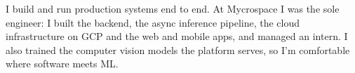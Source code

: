 
\begin{cvparagraph}
I build and run production systems end to end. At Mycrospace I was the sole engineer: I built the backend, the async inference pipeline, the cloud infrastructure on GCP and the web and mobile apps, and managed an intern. I also trained the computer vision models the platform serves, so I'm comfortable where software meets ML.
\end{cvparagraph}
